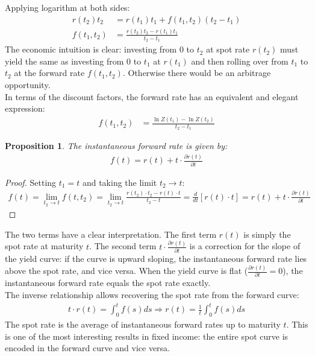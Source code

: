 \documentclass{article}
\theoremstyle{definition}  %
\theoremstyle{plain}  %
\newtheorem{proposition}{Proposition}[section]
\numberwithin{definition}{section}
\numberwithin{proposition}{section}
\numberwithin{theorem}{section}
\numberwithin{equation}{section}
\begin{document}
Applying logarithm at both sides:
\begin{align*}
    r(t_{2}) t_{2} &= r(t_{1}) t_{1} + f(t_{1}, t_{2}) (t_{2} - t_{1}) \\
    f(t_{1}, t_{2}) &= \frac{r(t_{2}) t_{2} - r(t_{1}) t_{1}}{t_{2} - t_{1}}
\end{align*}
The economic intuition is clear: investing from $0$ to $t_{2}$ at spot rate $r(t_{2})$ must yield the same as investing from $0$ to $t_{1}$ at $r(t_{1})$ and then rolling over from $t_{1}$ to $t_{2}$ at the forward rate $f(t_{1}, t_{2})$. Otherwise there would be an arbitrage opportunity. \\
In terms of the discount factors, the forward rate has an equivalent and elegant expression:
\begin{align*}
    f(t_{1}, t_{2}) &= \frac{\ln Z(t_{1}) - \ln Z(t_{2})}{t_{2} - t_{1}}
\end{align*}

\begin{proposition}
    The instantaneous forward rate is given by:
    \begin{align*}
        f(t) = r(t) + t \cdot \frac{\partial r(t)}{\partial t}
    \end{align*}
\end{proposition}

\begin{proof}
    Setting $t_1 = t$ and taking the limit $t_{2} \to t$:
    \begin{align*}
        f(t) = \lim_{t_2 \to t} f(t, t_2) = \lim_{t_2 \to t} \frac{r(t_2) \cdot t_2 - r(t) \cdot t}{t_2 - t} = \frac{d}{dt} [r(t) \cdot t] = r(t) + t \cdot \frac{\partial r(t)}{\partial t}
    \end{align*}
\end{proof}
The two terms have a clear interpretation. The first term $r(t)$ is simply the spot rate at maturity $t$. The second term $t \cdot \frac{\partial r(t)}{\partial t}$ is a correction for the slope of the yield curve: if the curve is upward sloping, the instantaneous forward rate lies above the spot rate, and vice versa. When the yield curve is flat ($\frac{\partial r(t)}{\partial t} = 0$), the instantaneous forward rate equals the spot rate exactly. \\
The inverse relationship allows recovering the spot rate from the forward curve:
\begin{align*}
    t \cdot r(t) = \int_{0}^{t} f(s) ds \Rightarrow 
    \boxed{
    r(t) = \frac{1}{t} \int_{0}^{t} f(s) ds
    }
\end{align*}
The spot rate is the average of instantaneous forward rates up to maturity $t$. This is one of the most interesting results in fixed income: the entire spot curve is encoded in the forward curve and vice versa.
\end{document}
